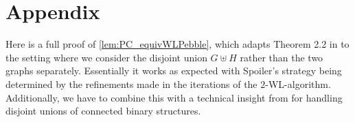 \documentclass[a4paper,UKenglish,cleveref, autoref, thm-restate]{lipics-v2021}
\newcommand{\WL}{\textrm {WL}}
\begin{document}
	\newpage
	
	
	
	
		\newpage
	
	

		\section{Appendix}
		\label{sec:appendix}

		
		Here is a full proof of \autoref{lem:PC_equivWLPebble}, which adapts Theorem 2.2 in \cite{sandraSiglog} to the setting where we consider the disjoint union $G \uplus H$ rather than the two graphs separately. Essentially it works as expected with Spoiler's strategy being determined by the refinements made in the iterations of the $2$-\WL-algorithm. Additionally, we have to combine this with a technical insight from \cite{dwl} for handling disjoint unions of connected binary structures.
		\restatePebbleLemma*
\end{document}
